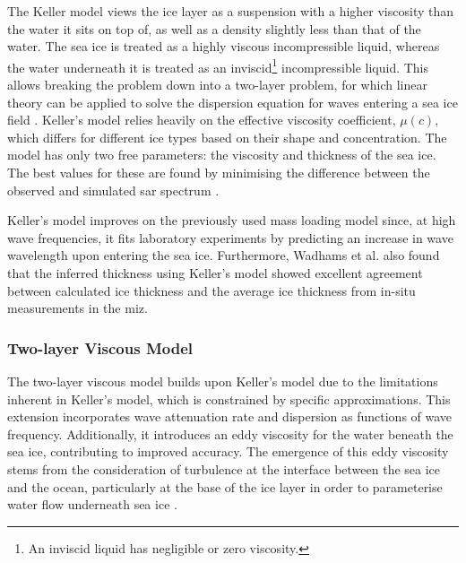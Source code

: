 The Keller model \cite{Keller1998} views the ice layer as a suspension with a higher viscosity than the water it sits on top of, as well as a density slightly less than that of the water. The sea ice is treated as a highly viscous incompressible liquid, whereas the water underneath it is treated as an inviscid\footnote{An inviscid liquid has negligible or zero viscosity.} incompressible liquid. This allows breaking the problem down into a two-layer problem, for which linear theory can be applied to solve the dispersion equation for waves entering a sea ice field \cite{Keller1998}. Keller's model relies heavily on the effective viscosity coefficient, $\mu(c)$, which differs for different ice types based on their shape and concentration. The model has only two free parameters: the viscosity and thickness of the sea ice. The best values for these are found by minimising the difference between the observed and simulated \acs{sar} spectrum \cite{Wadhams2004}.

Keller's model improves on the previously used mass loading model since, at high wave frequencies, it fits laboratory experiments by predicting an increase in wave wavelength upon entering the sea ice. Furthermore, Wadhams et al. \cite{Wadhams2004} also found that the inferred thickness using Keller's model showed excellent agreement between calculated ice thickness and the average ice thickness from in-situ measurements in the \acs{miz}.

\subsubsection{Two-layer Viscous Model} \label{subsubsec:litReview.sarCharac.seaIceWaveModelling.twoLayer}

The two-layer viscous model \cite{DeCarolis2002} builds upon Keller's model due to the limitations inherent in Keller's model, which is constrained by specific approximations. This extension incorporates wave attenuation rate and dispersion as functions of wave frequency. Additionally, it introduces an eddy viscosity for the water beneath the sea ice, contributing to improved accuracy. The emergence of this eddy viscosity stems from the consideration of turbulence at the interface between the sea ice and the ocean, particularly at the base of the ice layer in order to parameterise water flow underneath sea ice \cite{DeCarolis2002,DeSanti2018}.

